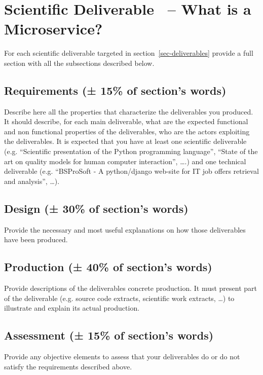 \section{Scientific Deliverable \thesdel\ -- What is a Microservice?}
{\color{gray}
For each scientific deliverable targeted in section~\ref{sec-deliverables} provide a full section with all the subsections described below.
\label{sec-production}

\subsection{Requirements (± 15\% of section's words)}
Describe here all the properties that characterize the deliverables you produced. It should describe, for each main deliverable, what are the expected functional and non functional properties of the deliverables, who are the actors exploiting the deliverables. It is expected that you have at least one scientific deliverable (e.g. ``Scientific presentation of the Python programming language'', ``State of the art on quality models for human computer interaction'', \ldots.) and one technical deliverable (e.g. ``BSProSoft - A python/django web-site for IT job offers retrieval and analysis'', \ldots). 
\subsection{Design (± 30\% of section's words)}
Provide the necessary and most useful explanations on how those deliverables have been produced.
\subsection{Production (± 40\% of section's words)}
Provide descriptions of the deliverables concrete production. It must present part of the deliverable (e.g. source code extracts, scientific work extracts, \ldots) to illustrate and explain its actual production.
\subsection{Assessment (± 15\% of section's words)}
Provide any objective elements to assess that your deliverables do or do not satisfy the requirements described above. 
}
